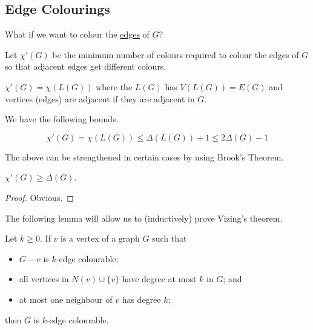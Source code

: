 \documentclass[main.tex]{subfiles}
\begin{document}
\subsection{Edge Colourings}
\begin{question*}
  What if we want to colour the \underline{edges} of $G$?
\end{question*}
Let $\chi'(G)$ be the minimum number of colours required to colour the edges of
$G$ so that adjacent edges get different colours.
\begin{note*}
  $\chi'(G) = \chi(L(G))$ where the  $L(G)$ has
  $V(L(G)) = E(G)$ and vertices (edges) are adjacent if they are adjacent in $G$.
\end{note*}
We have the following bounds.
\begin{proposition}
  \leavevmode\vspace{-1em}
  \[
    \chi'(G) = \chi(L(G))\leq\Delta(L(G)) + 1 \leq 2\Delta(G) - 1
  \]
\end{proposition}
The above can be strengthened in certain cases by using Brook's Theorem.
\begin{proposition}
  $\chi'(G)\geq\Delta(G)$.
\end{proposition}
\begin{proof}
  Obvious.
\end{proof}
The following lemma will allow us to (inductively) prove Vizing's theorem.
\begin{lemma}[Schrijver]
  Let $k\geq 0$.
  If $v$ is a vertex of a graph $G$ such that
  \begin{itemize}
    \item $G - v$ is $k$-edge colourable;
    \item all vertices in $N(v)\cup\{v\}$ have degree at most $k$ in $G$; and
    \item at most one neighbour of $v$ has degree $k$;%
  \end{itemize}
  then $G$ is $k$-edge colourable.
\end{lemma}
\end{document}
